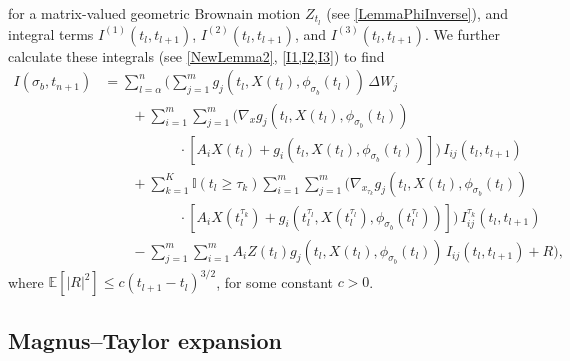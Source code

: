 \documentclass[onefignum]{siamart250211}
\providecommand{\abs}[1]{\left|#1\right|}
\begin{document}
for a matrix-valued geometric Brownain motion $Z_{t_l}$ (see \cref{LemmaPhiInverse}), and integral terms $I^{(1)}(t_l,t_{l+1})$, $I^{(2)}(t_l,t_{l+1})$, and $I^{(3)}(t_l,t_{l+1})$. We further calculate these integrals (see \cref{NewLemma2}, \cref{I1,I2,I3}) to find
\begin{align}
I(\sigma_b,t_{n+1})&=\sum_{l=\alpha}^n\bigg(\sum_{j=1}^mg_j(t_l,X(t_l),\phi_{\sigma_b}(t_l))\,\Delta W_j\nonumber\\
&\quad\quad+\sum_{i=1}^m\sum_{j=1}^m\bigg(\nabla_xg_j(t_l,X(t_l),\phi_{\sigma_b}(t_l))\nonumber\\
&\quad\quad\quad\hspace{1cm}\cdot[A_iX(t_l)+g_i(t_l,X(t_l),\phi_{\sigma_b}(t_l))]\bigg)\,I_{ij}(t_l,t_{l+1})\nonumber\\
&\quad\quad+\sum_{k=1}^K\mathbb{I}(t_l\geqslant\tau_k)\sum_{i=1}^m\sum_{j=1}^m\bigg(\nabla_{x_{\tau_k}}g_j(t_l,X(t_l),\phi_{\sigma_b}(t_l))\nonumber\\
&\quad\quad\quad\hspace{1cm}\cdot[A_iX(t_l^{\tau_k})+g_i(t_l^{\tau_l},X(t_l^{\tau_l}),\phi_{\sigma_b}(t_l^{\tau_l}))]\bigg)\,I_{ij}^{\tau_k}(t_l,t_{l+1})\nonumber\\
&\quad\quad-\sum_{j=1}^m\sum_{i=1}^mA_iZ(t_l)g_j(t_l,X(t_l),\phi_{\sigma_b}(t_l))\,I_{ij}(t_l,t_{l+1})+R\bigg),\nonumber
\end{align}
where $\mathbb{E}[\abs{R}^2]\leqslant c(t_{l+1}-t_l)^{3/2}$, for some constant $c>0$.

\subsection{Magnus--Taylor expansion}
\end{document}
